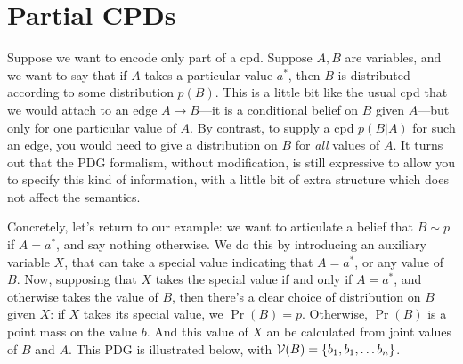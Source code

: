 \documentclass{article}
\title{}
\author{}
\date{May 2021}
\begin{document}
	\section{Partial CPDs}
	Suppose we want to encode only part of a cpd. Suppose $A, B$ are variables, and we want to say that if $A$ takes a particular value $a^*$, then $B$ is distributed according to some distribution $p(B)$.
	This is a little bit like the usual cpd that we would attach to an edge $A \to B$---it is a conditional belief on $B$ given $A$---but only for one particular value of $A$. By contrast, to supply a cpd $p(B | A)$ for such an edge, you would need to give a distribution on $B$ for \emph{all} values of $A$.
	It turns out that the PDG formalism, without modification, is still expressive to allow you to specify this kind of information, with a little bit of extra structure which does not affect the semantics.

	Concretely, let's return to our example: we want to articulate a belief that $B \sim p$ if $A = a^*$, and say nothing otherwise.  We do this by introducing an auxiliary variable $X$, that can take a special value indicating that $A = a^*$, or any value of $B$. Now, supposing that $X$ takes the special value if and only if $A=a^*$, and otherwise takes the value of $B$, then there's a clear choice of distribution on $B$ given $X$: if $X$ takes its special value, we $\Pr(B) = p$. Otherwise, $\Pr(B)$ is a point mass on the value $b$. And this value of $X$ an be calculated from joint values of $B$ and $A$.  This PDG is illustrated below, with $\mathcal V(B) = \{b_1, b_1, \ldots b_n\}$.
\end{document}
